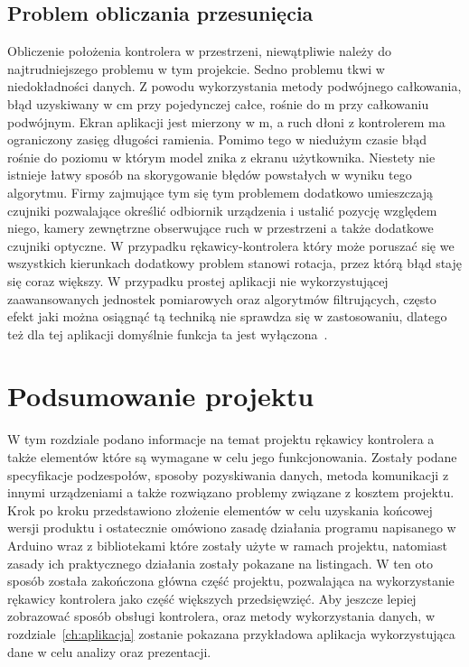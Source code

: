  
 \subsection{Problem obliczania przesunięcia}
 \label{subsec:iuPrzesunięcie}
 Obliczenie położenia kontrolera w przestrzeni, niewątpliwie należy do najtrudniejszego problemu w tym projekcie. Sedno problemu tkwi w niedokładności danych. Z powodu wykorzystania metody podwójnego całkowania, błąd uzyskiwany w cm przy pojedynczej całce, rośnie do m przy całkowaniu podwójnym. Ekran aplikacji jest mierzony w m, a ruch dłoni z kontrolerem ma ograniczony zasięg długości ramienia. Pomimo tego w niedużym czasie błąd rośnie do poziomu w którym model znika z ekranu użytkownika. Niestety nie istnieje łatwy sposób na skorygowanie błędów powstałych w wyniku tego algorytmu. Firmy zajmujące tym się tym problemem dodatkowo umieszczają czujniki pozwalające określić odbiornik urządzenia i ustalić pozycję względem niego, kamery zewnętrzne obserwujące ruch w przestrzeni a także dodatkowe czujniki optyczne. W przypadku rękawicy-kontrolera który może poruszać się we wszystkich kierunkach dodatkowy problem stanowi rotacja, przez którą błąd staję się coraz większy. W przypadku prostej aplikacji nie wykorzystującej zaawansowanych jednostek pomiarowych oraz algorytmów filtrujących, często efekt jaki można osiągnąć tą techniką nie sprawdza się w zastosowaniu, dlatego też dla tej aplikacji domyślnie funkcja ta jest wyłączona~\cite{sensorslab}. 
 
\section{Podsumowanie projektu}
\label{sec:summary}
W tym rozdziale podano informacje na temat projektu rękawicy kontrolera a także elementów które są wymagane w celu jego funkcjonowania. Zostały podane specyfikacje podzespołów, sposoby pozyskiwania danych, metoda komunikacji z innymi urządzeniami a także rozwiązano problemy związane z kosztem projektu. Krok po kroku przedstawiono złożenie elementów w celu uzyskania końcowej wersji produktu i ostatecznie omówiono zasadę działania programu napisanego w Arduino wraz z bibliotekami które zostały użyte w ramach projektu, natomiast zasady ich praktycznego działania zostały pokazane na listingach. W ten oto sposób została zakończona główna część projektu, pozwalająca na wykorzystanie rękawicy kontrolera jako część większych przedsięwzięć. Aby jeszcze lepiej zobrazować sposób obsługi kontrolera, oraz metody wykorzystania danych, w rozdziale~\ref{ch:aplikacja} zostanie pokazana przykładowa aplikacja wykorzystująca dane w celu analizy oraz prezentacji. 